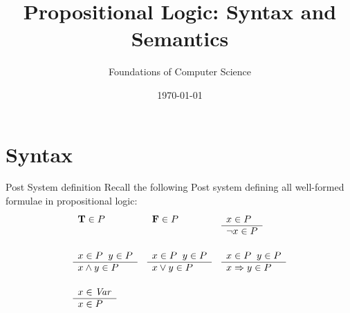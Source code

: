 \documentclass[style=sailor,size=12pt]{powerdot}
\title{Propositional Logic: Syntax and Semantics}
\author{Foundations of Computer Science}
\date{\today}
\begin{document}
\maketitle
\section[slide=true]{Syntax}

\begin{wideslide}[bm=,toc=]{Post System definition}
Recall the following Post system defining all well-formed formulae in
propositional logic:
\begin{displaymath}
\begin{array}{lll}
        \begin{array}[t]{l}
        \mbox{\bf T}\in P
        \end{array}
&
        \begin{array}[t]{l}
        \mbox{\bf F}\in P
        \end{array}
&
	\begin{array}[t]{l}
        x \in P \\
        \hline
        \neg x \in P
        \end{array} \\[6ex]

	\begin{array}[t]{l}
	x \in P \;\;y \in P \\
	\hline
	x \wedge y \in P
	\end{array}
&
	\begin{array}[t]{l}
	x \in P \;\;y \in P \\
	\hline
	x \vee y \in P
	\end{array}
&
	\begin{array}[t]{l}
	x \in P \;\;y \in P \\
	\hline
	x \Rightarrow y \in P
	\end{array} \\[6ex]

	\begin{array}[t]{l}
        x \in \mbox{\it Var\/} \\
        \hline
        x \in P
        \end{array}
\end{array}
\end{displaymath}

\end{wideslide}
\end{document}
